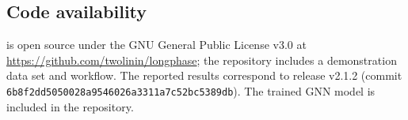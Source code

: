\subsection*{Code availability}
\toolname is open source under the GNU General Public License v3.0 at \url{https://github.com/twolinin/longphase}; the repository includes a demonstration data set and workflow.  The reported results correspond to release v2.1.2 (commit \texttt{6b8f2dd5050028a9546026a3311a7c52bc5389db}).
  The trained GNN model is included in the repository.
